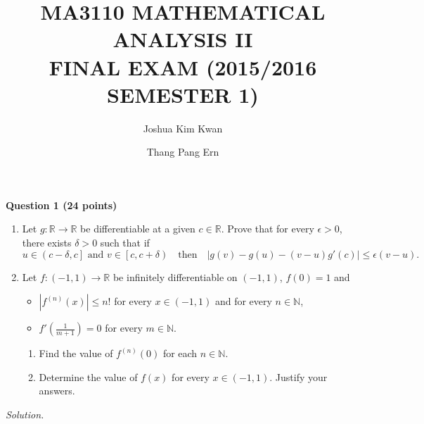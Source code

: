 \documentclass[11pt]{amsart}
\title {MA3110 MATHEMATICAL ANALYSIS II\\ FINAL EXAM (2015/2016 SEMESTER 1)}
\author{Joshua Kim Kwan}
\author{Thang Pang Ern}
\theoremstyle{plain}
\numberwithin{equation}{section}
\begin{document}
\maketitle
\noindent

\textbf{Question 1 (24 points)}
\begin{enumerate}[label=\textbf{(\alph*)}]
    \itemsep 0em
    \item Let $g:\mathbb{R}\longrightarrow\mathbb{R}$ be differentiable at a given $c\in\mathbb{R}$. Prove that for every $\epsilon>0$, there exists $\delta>0$ such that if \[u\in \left(c-\delta,c\right]\text{ and }v\in \left[c,c+\delta\right)\quad\text{then}\quad \left|g(v)-g(u)-(v-u)g'(c)\right|\leq\epsilon(v-u).\]
\item Let $f:(-1,1)\longrightarrow\mathbb{R}$ be infinitely differentiable on $(-1,1)$, $f(0)=1$ and
\begin{itemize}
\itemsep 0em
    \item $\left|f^{(n)}(x)\right|\leq n!$ for every $x\in(-1,1)$ and for every $n\in\mathbb{N}$,
    \item $f'\left(\frac{1}{m+1}\right)=0$ for every $m\in\mathbb{N}$.
\end{itemize}
\begin{enumerate}[label=\textbf{(\roman*)}]
    \itemsep 0em
    \item Find the value of $f^{(n)}(0)$ for each $n\in\mathbb{N}$.
    \item Determine the value of $f(x)$ for every $x\in(-1,1)$. Justify your answers.
\end{enumerate}
\end{enumerate}
\noindent\emph{Solution.}
\end{document}
